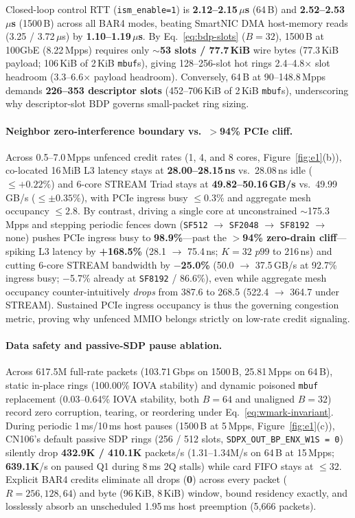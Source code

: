 Closed-loop control RTT (\texttt{ism\_enable=1}) is \textbf{2.12--2.15\,$\mu$s}
(64\,B) and \textbf{2.52--2.53\,$\mu$s} (1500\,B) across all BAR4 modes, beating
SmartNIC DMA host-memory reads (3.25 / 3.72\,$\mu$s) by \textbf{1.10--1.19\,$\mu$s}.
By Eq.~\ref{eq:bdp-slots} ($B=32$), 1500\,B at 100GbE (8.22\,Mpps) requires
only \textbf{$\sim$53 slots / 77.7\,KiB} wire bytes (77.3\,KiB payload;
106\,KiB of 2\,KiB \texttt{mbuf}s), giving 128--256-slot hot rings
2.4--4.8$\times$ slot headroom (3.3--6.6$\times$ payload headroom). Conversely,
64\,B at 90--148.8\,Mpps demands \textbf{226--353 descriptor slots}
(452--706\,KiB of 2\,KiB \texttt{mbuf}s), underscoring why descriptor-slot BDP
governs small-packet ring sizing.

\paragraph{Neighbor zero-interference boundary vs.\ $>$94\% PCIe cliff.}
Across 0.5--7.0\,Mpps unfenced credit rates (1, 4, and 8 cores,
Figure~\ref{fig:e1}(b)), co-located 16\,MiB L3 latency stays at
\textbf{28.00--28.15\,ns} vs.\ 28.08\,ns idle ($\le +0.22\%$) and 6-core STREAM
Triad stays at \textbf{49.82--50.16\,GB/s} vs.\ 49.99\,GB/s ($\le \pm 0.35\%$),
with PCIe ingress busy $\le 0.3\%$ and aggregate mesh occupancy $\le 2.8$. By
contrast, driving a single core at unconstrained $\sim$175.3\,Mpps and stepping
periodic fences down (\texttt{SF512} $\to$ \texttt{SF2048} $\to$ \texttt{SF8192}
$\to$ none) pushes PCIe ingress busy to \textbf{98.9\%}---past the
\textbf{$>$94\% zero-drain cliff}---spiking L3 latency by \textbf{+168.5\%}
(28.1 $\to$ 75.4\,ns; $K=32$ $p99$ to 216\,ns) and cutting 6-core STREAM
bandwidth by \textbf{$-$25.0\%} (50.0 $\to$ 37.5\,GB/s at 92.7\% ingress busy;
$-$5.7\% already at \texttt{SF8192} / 86.6\%), even while aggregate mesh
occupancy counter-intuitively \emph{drops} from 387.6 to 268.5 (522.4 $\to$
364.7 under STREAM). Sustained PCIe ingress occupancy is thus the governing
congestion metric, proving why unfenced MMIO belongs strictly on low-rate
credit signaling.

\paragraph{Data safety and passive-SDP pause ablation.}
Across 617.5M full-rate packets (103.71\,Gbps on 1500\,B, 25.81\,Mpps on 64\,B),
static in-place rings (100.00\% IOVA stability) and dynamic poisoned
\texttt{mbuf} replacement (0.03--0.64\% IOVA stability, both $B=64$ and
unaligned $B=32$) record zero corruption, tearing, or reordering under
Eq.~\ref{eq:wmark-invariant}. During periodic 1\,ms/10\,ms host pauses (1500\,B
at 5\,Mpps, Figure~\ref{fig:e1}(c)), CN106's default passive SDP rings (256 /
512 slots, \texttt{SDPX\_OUT\_BP\_ENX\_W1S = 0}) silently drop \textbf{432.9K /
410.1K} packets/s (1.31--1.34M/s on 64\,B at 15\,Mpps; \textbf{639.1K}/s on
paused Q1 during 8\,ms 2Q stalls) while card FIFO stays at $\le 32$. Explicit
BAR4 credits eliminate all drops (\textbf{0}) across every packet ($R=256, 128, 64$)
and byte (96\,KiB, 8\,KiB) window, bound residency exactly, and losslessly
absorb an unscheduled 1.95\,ms host preemption (5,666 packets).

